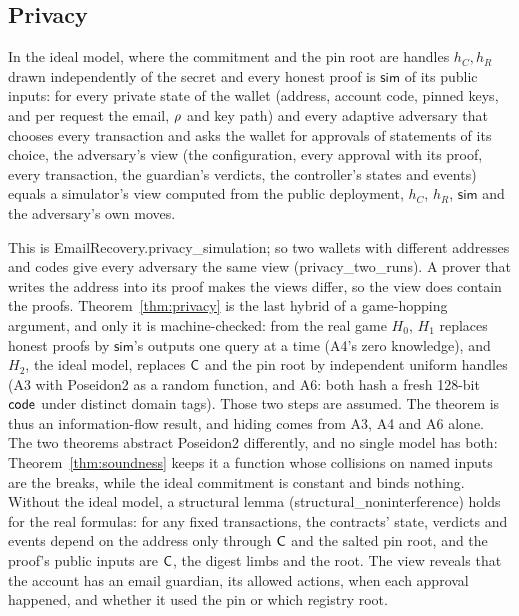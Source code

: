 \subsection{Privacy}

\begin{theorem}\label{thm:privacy}
In the ideal model, where the commitment and the pin root are handles $h_C,
h_R$ drawn independently of the secret and every honest proof is
$\mathsf{sim}$ of its public inputs: for every private state of the wallet
(address, account code, pinned keys, and per request the email, $\rho$ and
key path) and every adaptive adversary that chooses every transaction and
asks the wallet for approvals of statements of its choice, the adversary's
view (the configuration, every approval with its proof, every transaction,
the guardian's verdicts, the controller's states and events) equals a
simulator's view computed from the public deployment, $h_C$, $h_R$,
$\mathsf{sim}$ and the adversary's own moves.
\end{theorem}
This is \textsf{EmailRecovery.\allowbreak privacy\_simulation}; so two wallets with
different addresses and codes give every adversary the same view
(\textsf{privacy\_two\_runs}). A prover that writes the
address into its proof makes the views differ, so the view does contain the
proofs. Theorem~\ref{thm:privacy} is the last hybrid of a game-hopping
argument, and only it is machine-checked: from the real game $H_0$, $H_1$
replaces honest proofs by $\mathsf{sim}$'s outputs one query at a time (A4's
zero knowledge), and $H_2$, the ideal model, replaces $\mathsf{C}$ and the pin root
by independent uniform handles (A3 with Poseidon2 as a random function, and
A6: both hash a fresh 128-bit $\mathsf{code}$ under distinct domain tags). Those two
steps are assumed. The
theorem is thus an information-flow result, and hiding comes from A3, A4 and
A6 alone. The two theorems abstract Poseidon2 differently, and no single
model has both: Theorem~\ref{thm:soundness} keeps it a function whose
collisions on named inputs are the breaks, while the ideal commitment is
constant and binds nothing. Without the
ideal model, a structural lemma (\textsf{structural\_noninterference}) holds
for the real formulas: for any fixed transactions, the contracts' state,
verdicts and events depend on the address only through $\mathsf{C}$ and the salted
pin root, and the proof's public inputs are $\mathsf{C}$, the digest limbs and the
root. The view reveals that
the account has an email guardian, its allowed actions, when each approval
happened, and whether it used the pin or which registry root.

